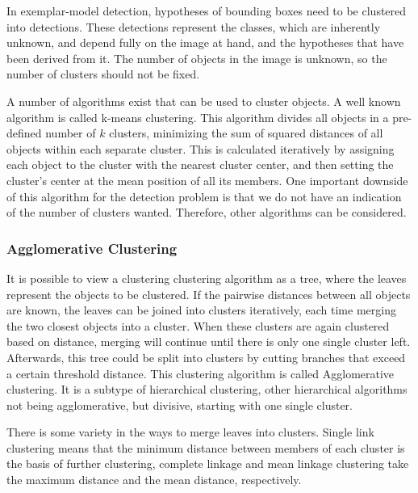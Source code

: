 In exemplar-model detection, hypotheses of bounding boxes need to be clustered into detections. These detections represent the classes, which are inherently unknown, and depend fully on the image at hand, and the hypotheses that have been derived from it. The number of objects in the image is unknown, so the number of clusters should not be fixed.

A number of algorithms exist that can be used to cluster objects. A well known algorithm is called k-means clustering. This algorithm divides all objects in a pre-defined number of $k$ clusters, minimizing the sum of squared distances of all objects within each separate cluster. This is calculated iteratively by assigning each object to the cluster with the nearest cluster center, and then setting the cluster's center at the mean position of all its members. One important downside of this algorithm for the detection problem is that we do not have an indication of the number of clusters wanted. Therefore, other algorithms can be considered.

\begin{figure}[hbt]
    \label{fig:sl_vs_qs_clustering}
    \centering
\end{figure}


\subsubsection{Agglomerative Clustering} %
\label{sub:agglomerative_clustering}
It is possible to view a clustering clustering algorithm as a tree, where the leaves represent the objects to be clustered. If the pairwise distances between all objects are known, the leaves can be joined into clusters iteratively, each time merging the two closest objects into a cluster. When these clusters are again clustered based on distance, merging will continue until there is only one single cluster left. Afterwards, this tree could be split into clusters by cutting branches that exceed a certain threshold distance. This clustering algorithm is called Agglomerative clustering. It is a subtype of hierarchical clustering, other hierarchical algorithms not being agglomerative, but divisive, starting with one single cluster.

There is some variety in the ways to merge leaves into clusters. Single link clustering means that the minimum distance between members of each cluster is the basis of further clustering, complete linkage and mean linkage clustering take the maximum distance and the mean distance, respectively.


